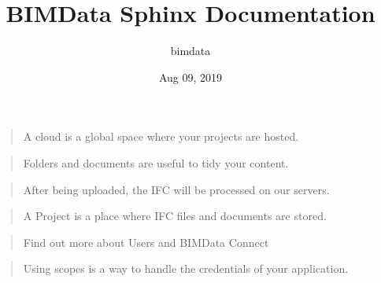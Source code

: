 \documentclass[a4paper,12pt,english]{sphinxmanual}
\title{BIMData Sphinx Documentation}
\date{Aug 09, 2019}
\author{bimdata}
\begin{document}
\pagestyle{empty}

\pagestyle{plain}

\pagestyle{normal}
\label{\detokenize{index::doc}}


\begin{sphinxShadowBox}
\begin{quote}

A cloud is a global space where your projects are hosted.
\end{quote}
\end{sphinxShadowBox}

\begin{sphinxShadowBox}
\begin{quote}

Folders and documents are useful to tidy your content.
\end{quote}
\end{sphinxShadowBox}

\begin{sphinxShadowBox}
\begin{quote}

After being uploaded, the IFC will be processed on our servers.
\end{quote}
\end{sphinxShadowBox}

\begin{sphinxShadowBox}
\begin{quote}

A Project is a place where IFC files and documents are stored.
\end{quote}
\end{sphinxShadowBox}

\begin{sphinxShadowBox}
\begin{quote}

Find out more about Users and BIMData Connect
\end{quote}
\end{sphinxShadowBox}

\begin{sphinxShadowBox}
\begin{quote}

Using scopes is a way to handle the credentials of your application.
\end{quote}
\end{sphinxShadowBox}
\end{document}

